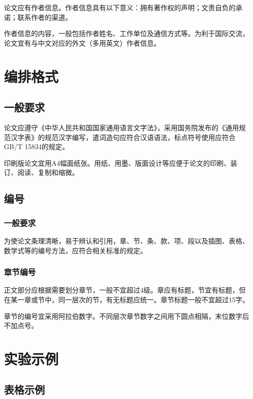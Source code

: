 \documentclass[a4paper,12pt]{ctexart}
\begin{document}
论文应有作者信息。作者信息具有以下意义：拥有著作权的声明；文责自负的承诺；联系作者的渠道。

作者信息的内容，一般包括作者姓名、工作单位及通信方式等。为利于国际交流，论文宜有与中文对应的外文（多用英文）作者信息。

\section{编排格式}

\subsection{一般要求}

论文应遵守《中华人民共和国国家通用语言文字法》，采用国务院发布的《通用规范汉字表》的规范汉字编写，遣词造句应符合汉语语法，标点符号使用应符合GB/T 15834的规定。

印刷版论文宜用A4幅面纸张。用纸、用墨、版面设计等应便于论文的印刷、装订、阅读、复制和缩微。

\subsection{编号}

\subsubsection{一般要求}

为使论文条理清晰，易于辨认和引用，章、节、条、款、项、段以及插图、表格、数学式等的编号方法，应符合相关标准的规定。

\subsubsection{章节编号}

正文部分应根据需要划分章节，一般不宜超过4级。章应有标题，节宜有标题，但在某一章或节中，同一层次的节，有无标题应统一。章节标题一般不宜超过15字。

章节的编号宜采用阿拉伯数字。不同层次章节数字之间用下圆点相隔，末位数字后不加点号。

\section{实验示例}

\subsection{表格示例}
\end{document}
